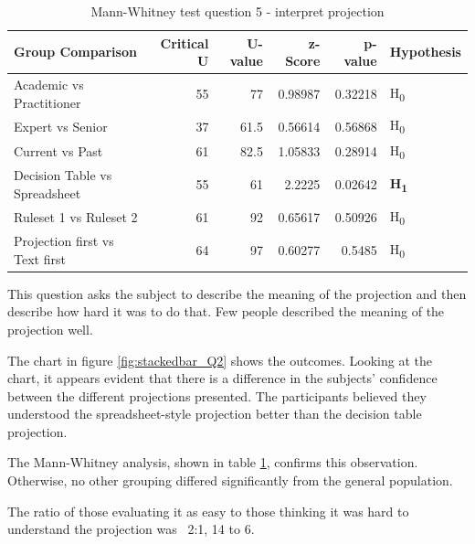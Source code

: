 \begin{table}
    \begin{center}
        \begin{tabular}{ |l ||r |r |r | r|l | } 
            \hline
            Group Comparison                 & Critical U & U-value & z-Score  & p-value & Hypothesis         \\
            \hline
            \hline
            Academic vs Practitioner         & 55        & 77      &  0.98987  & 0.32218 & H\textsubscript{0} \\ 
            \hline
            Expert vs Senior                 & 37        & 61.5    &  0.56614  & 0.56868 & H\textsubscript{0} \\ 
            \hline
            Current vs Past                  & 61        & 82.5    &  1.05833  & 0.28914 & H\textsubscript{0} \\ 
            \hline
            Decision Table vs Spreadsheet    & 55        & 61      &  2.2225   & 0.02642 & \textbf{H\textsubscript{1}}  \\ 
            \hline
            Ruleset 1 vs Ruleset 2           & 61        & 92      &  0.65617  & 0.50926 & H\textsubscript{0} \\ 
            \hline
            Projection first vs Text first   & 64        & 97      &  0.60277  & 0.5485  & H\textsubscript{0} \\ 
            \hline
        \end{tabular}
    \end{center}
    \caption{Mann-Whitney test question 5 - interpret projection}
    \label{table:mannwhitneyQ2}
\end{table}

This question asks the subject to describe the meaning of the projection and then describe how hard it was to do that.
Few people described the meaning of the projection well.

The chart in figure \ref{fig:stackedbar_Q2} shows the outcomes.
Looking at the chart, it appears evident that there is a difference in the subjects' confidence between the different projections presented.
The participants believed they understood the spreadsheet-style projection better than the decision table projection.

The Mann-Whitney analysis, shown in table \ref{table:mannwhitneyQ2}, confirms this observation.
Otherwise, no other grouping differed significantly from the general population.

The ratio of those evaluating it as easy to those thinking it was hard to understand the projection was ~2:1, 14 to 6.

